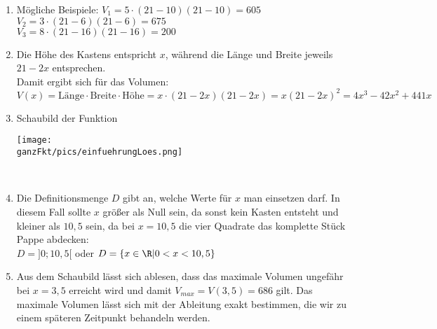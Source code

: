 \begin{enumerate}[label=\alph*)]
	\item Mögliche Beispiele: \(V_1=5\cdot \left(21-10\right)\left(21-10\right)=605\)\\
	\hphantom{Mögliche Beispiele: }\(V_2=3\cdot \left(21-6\right)\left(21-6\right)=675\)\\
	\hphantom{Mögliche Beispiele: }\(V_3=8\cdot \left(21-16\right)\left(21-16\right)=200\)
	\item Die Höhe des Kastens entspricht \(x\), während die Länge und Breite jeweils \(21-2x\) entsprechen.\\
	Damit ergibt sich für das Volumen:\\
	\(V(x)=\text{Länge}\cdot \text{Breite}\cdot \text{Höhe}=x\cdot \left(21-2x\right)\left(21-2x\right)=x\left(21-2x\right)^2=4x^3-42x^2+441x\)
	\item
	Schaubild der Funktion\\
	\begin{minipage}{\linewidth}
		\texttt{[image: \\ganzFkt/pics/einfuehrungLoes.png]}
	\end{minipage}\\
	\item Die Definitionsmenge \(D\) gibt an, welche Werte für \(x\) man einsetzen darf. In diesem Fall sollte \(x\) größer als Null sein, da sonst kein Kasten entsteht und kleiner als \(10,5\) sein, da bei \(x=10,5\) die vier Quadrate das komplette Stück Pappe abdecken:\\
	\(D=]0;10,5[\) oder \(D=\{x\in\R | 0< x < 10,5\}\)
	\item Aus dem Schaubild lässt sich ablesen, dass das maximale Volumen ungefähr bei \(x=3,5\) erreicht wird und damit  \(V_{max}=V(3,5)=686\) gilt. Das maximale Volumen lässt sich mit der Ableitung exakt bestimmen, die wir zu einem späteren Zeitpunkt behandeln werden.
\end{enumerate}